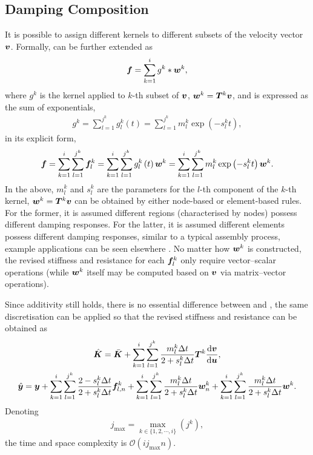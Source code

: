 \subsection{Damping Composition}
It is possible to assign different kernels to different subsets of the velocity vector $\bm{v}$. Formally,  can be further extended as
\begin{gather}
\bm{f}=\sum_{k=1}^{i}g^k*\bm{w}^k,
\end{gather}
where $g^k$ is the kernel applied to $k$-th subset of $\bm{v}$, $\bm{w}^k=\bm{T}^k\bm{v}$, and is expressed as the sum of exponentials,
\begin{gather}
g^k=\sum_{l=1}^{j^k}g_l^k\left(t\right)=\sum_{l=1}^{j^k}m_l^k\exp\left(-s_l^kt\right),
\end{gather}
in its explicit form,
\begin{gather}\label{eq:composition}
\bm{f}=\sum_{k=1}^{i}\sum_{l=1}^{j^k}\bm{f}_l^k=\sum_{k=1}^{i}\sum_{l=1}^{j^k}g_l^k\left(t\right)\bm{w}^k=\sum_{k=1}^{i}\sum_{l=1}^{j^k}m_l^k\exp\left(-s_l^kt\right)\bm{w}^k.
\end{gather}
In the above, $m_l^k$ and $s_l^k$ are the parameters for the $l$-th component of the $k$-th kernel, $\bm{w}^k=\bm{T}^k\bm{v}$ can be obtained by either node-based or element-based rules. For the former, it is assumed different regions (characterised by nodes) possess different damping responses. For the latter, it is assumed different elements possess different damping responses, similar to a typical assembly process, example applications can be seen elsewhere \citep{Friswell2007}.
No matter how $\bm{w}^k$ is constructed, the revised stiffness and resistance for each $\bm{f}_l^k$ only require vector--scalar operations (while $\bm{w}^k$ itself may be computed based on $\bm{v}$ via matrix--vector operations).

Since additivity still holds, there is no essential difference between  and , the same discretisation can be applied so that the revised stiffness and resistance can be obtained as
\begin{gather}\label{eq:revised_k_comp}
\hat{\bm{K}}=\bar{\bm{K}}+\sum_{k=1}^{i}\sum_{l=1}^{j^k}\dfrac{m_l^k\Delta{}t}{2+s_l^k\Delta{}t}\bm{T}^k\dfrac{\mathrm{d}\bm{v}}{\mathrm{d}\bm{u}},\\
\label{eq:revised_y_comp}
\hat{\bm{y}}=\bm{y}+\sum_{k=1}^{i}\sum_{l=1}^{j^k}\dfrac{2-s_l^k\Delta{}t}{2+s_l^k\Delta{}t}\bm{f}_{l,n}^k+\sum_{k=1}^{i}\sum_{l=1}^{j^k}\dfrac{m_l^k\Delta{}t}{2+s_l^k\Delta{}t}\bm{w}_n^k+\sum_{k=1}^{i}\sum_{l=1}^{j^k}\dfrac{m_l^k\Delta{}t}{2+s_l^k\Delta{}t}\bm{w}^k.
\end{gather}
Denoting
\begin{gather}
j_\text{max}=\max_{k\in\{1,2,\cdots,i\}}\left(j^k\right),
\end{gather}
the time and space complexity is $\mathcal{O}\left(ij_\text{max}n\right)$.
